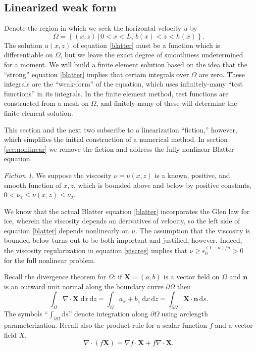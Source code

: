 \documentclass[11pt,final,reqno]{amsart}
\theoremstyle{remark}
\newtheorem*{fiction}{Fiction}
\theoremstyle{definition}
\newcommand{\eps}{\epsilon}
\begin{document}
\subsection*{Linearized weak form}  Denote the region in which we seek the horizontal velocity $u$ by
\begin{equation}
	\Omega = \left\{(x,z) \,\Big|\, 0<x<L, \, b(x) < z < h(x)\right\}. \label{domain}
\end{equation}
The solution $u(x,z)$ of equation \eqref{blatter} must be a function which is differentiable on $\Omega$, but we leave the exact degree of smoothness undetermined for a moment.  We will build a finite element solution based on the idea that the ``strong'' equation \eqref{blatter} implies that certain integrals over $\Omega$ are zero.  These integrals are the ``weak-form'' of the equation, which uses infinitely-many ``test functions'' in its integrals.  In the finite element method, test functions are constructed from a mesh on $\Omega$, and finitely-many of these will determine the finite element solution.

This section and the next two subscribe to a linearization ``fiction,'' however, which simplifies the initial construction of a numerical method.  In section \ref{sec:nonlinear} we remove the fiction and address the fully-nonlinear Blatter equation.

\begin{fiction}  We suppose the viscosity $\nu=\nu(x,z)$ is a known, positive, and smooth function of $x,z$, which is bounded above and below by positive constants, $0 < \nu_1 \le \nu(x,z) \le \nu_2$.
\end{fiction}

We know that the actual Blatter equation \eqref{blatter} incorporates the Glen law for ice, wherein the viscosity depends on derivatives of velocity, so the left side of equation \eqref{blatter} depends nonlinearly on $u$.  The assumption that the viscosity is bounded below turns out to be both important and justified, however.  Indeed, the viscosity regularization in equation \eqref{viscreg} implies that $\nu \ge  \eps_0^{(1-n)/n} > 0$ for the full nonlinear problem.

Recall the divergence theorem for $\Omega$: if $\mathbf{X}=(a,b)$ is a vector field on $\Omega$ and $\mathbf{n}$ is an outward unit normal along the boundary curve $\partial\Omega$ then
\newcommand{\dxdz}{\;\mathrm{d}x\,\mathrm{d}z} 
	$$\int_\Omega \nabla\cdot \mathbf{X} \dxdz = \int_\Omega a_x + b_z \dxdz = \int_{\partial\Omega} \mathbf{X}\cdot \mathbf{n}\,\mathrm{d}s.$$
The symbols ``$\int_{\partial\Omega} \mathrm{d}s$'' denote integration along $\partial\Omega$ using arclength parameterization.  Recall also the product rule for a scalar function $f$ and a vector field $X$,
	$$\nabla\cdot \left(f \mathbf{X}\right) = \nabla f\cdot \mathbf{X} + f \nabla\cdot \mathbf{X}.$$
\end{document}
